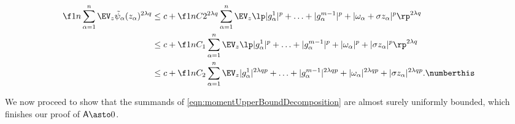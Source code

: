 \documentclass[main.tex]{subfiles}
\begin{document}
\begin{align*}
  \f 1 n \sum_{\alpha=1}^n \EV_z \tilde \psi_\alpha(\rvec_\alpha)^{2\lambda q}
  &\le
      c + 
      \f 1 n C 2^{2\lambda q}
      \sum_{\alpha=1}^n
          \EV_z 
              \lp 
                  |g^1_\alpha|^p + \ldots + |g^{\MM-1}_\alpha|^p + |\omega_\alpha + \sigma \rvec_\alpha|^p
              \rp^{2\lambda q}
      \\
  &\le
      c + 
      \f 1 n C_1
      \sum_{\alpha=1}^n
          \EV_z 
              \lp 
                  |g^1_\alpha|^p + \ldots + |g^{\MM-1}_\alpha|^p + |\omega_\alpha|^p + |\sigma \rvec_\alpha|^p
              \rp^{2\lambda q}
      \\
  &\le
      c +
      \f 1 n C_2
      \sum_{\alpha=1}^n
        \EV_z 
          |g^1_\alpha|^{2 \lambda q p} + \ldots + |g^{\MM-1}_\alpha|^{2 \lambda q p} + |\omega_\alpha|^{2 \lambda q p}
          + |\sigma \rvec_\alpha|^{2 \lambda q p}
      .
      \numberthis \label{eqn:momentUpperBoundDecomposition}
  \end{align*}
  
  We now proceed to show that the summands of \cref{eqn:momentUpperBoundDecomposition} are almost surely uniformly bounded, which finishes our proof of $\probA \asto 0$.
  
\end{document}
